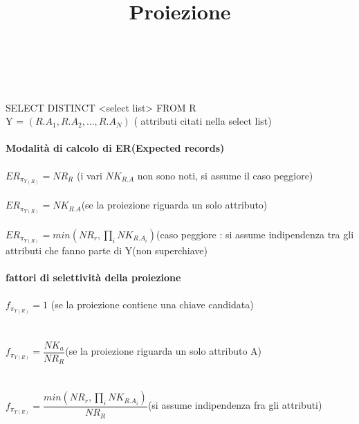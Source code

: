 \documentclass[a4paper,12pt]{article}
\begin{document}
\begin{titlepage}
\begin{titlepage}
\begin{center}
		\end{center}
		\end{titlepage}
		\begin{titlepage}
		\title{\huge \textbf{Proiezione}} \\ \\
		\maketitle
		SELECT DISTINCT <select list> FROM R \\
		Y = ${{(R.A_{1}, R.A_{2}, ..., R.A_{N})}}$ ( attributi citati nella select list) \\ \\
		\textbf{Modalità di calcolo di ER(Expected records)} \\ \\
		$ ER_{\pi_{Y(R)}} = NR_{R} $ (i vari $ NK_{R.A} $ non sono noti, si assume il caso peggiore) \\ \\
		$ ER_{\pi_{Y(R)}} = NK_{R.A} $(se la proiezione riguarda un solo attributo)  \\\\
		$ ER_{\pi_{Y(R)}} = min(NR_{r}, \prod_{i}^{} NK_{R.A_{i}}) $(caso peggiore : si assume indipendenza tra gli attributi che fanno parte di Y(non superchiave) \\\\
		\textbf{fattori di selettività della proiezione} \\ \\
		$ f_{\pi_{Y(R)}} = 1 $ (se la proiezione contiene una chiave candidata) \\ \\\\
		$ f_{\pi_{Y(R)}} = \dfrac{NK_{a}}{NR_{R}} $(se la proiezione riguarda un solo attributo A)\\ \\\\
		$ f_{\pi_{Y(R)}} = \dfrac{min(NR_{r}, \prod_{i}^{} NK_{R.A_{i}})}{NR_{R}} $(si assume indipendenza fra gli attributi) \\ \\
					
		\end{titlepage}
	\end{titlepage}
\end{document}
